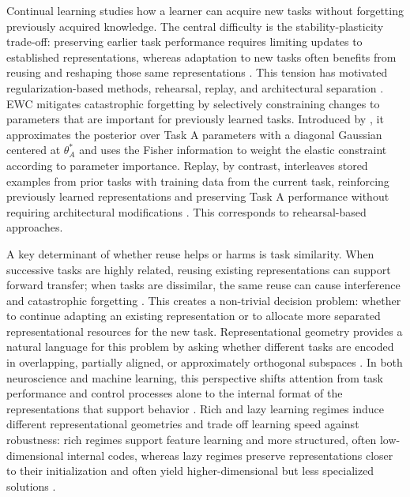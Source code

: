 \documentclass[letterpaper]{article}
\begin{document}
Continual learning studies how a learner can acquire new tasks without forgetting previously acquired knowledge. The central difficulty is the stability-plasticity trade-off: preserving earlier task performance requires limiting updates to established representations, whereas adaptation to new tasks often benefits from reusing and reshaping those same representations \cite{lee2021continual,holton2025humans}. This tension has motivated regularization-based methods, rehearsal, replay, and architectural separation \cite{wickramasinghe2023continual}. EWC mitigates catastrophic forgetting by selectively constraining changes to parameters that are important for previously learned tasks. Introduced by \cite{kirkpatrick2017overcoming}, it approximates the posterior over Task A parameters with a diagonal Gaussian centered at $\theta^{*}_{A}$ and uses the Fisher information to weight the elastic constraint according to parameter importance. Replay, by contrast, interleaves stored examples from prior tasks with training data from the current task, reinforcing previously learned representations and preserving Task A performance without requiring architectural modifications \cite{robins1995catastrophic,rolnick2019experience,van2020brain}. This corresponds to rehearsal-based approaches.

A key determinant of whether reuse helps or harms is task similarity. When successive tasks are highly related, reusing existing representations can support forward transfer; when tasks are dissimilar, the same reuse can cause interference and catastrophic forgetting \cite{lee2021continual,menghi2025impact,holton2025humans, wakhloo2026neural}. This creates a non-trivial decision problem: whether to continue adapting an existing representation or to allocate more separated representational resources for the new task. Representational geometry provides a natural language for this problem by asking whether different tasks are encoded in overlapping, partially aligned, or approximately orthogonal subspaces \cite{flesch2022representation}. In both neuroscience and machine learning, this perspective shifts attention from task performance and control processes alone to the internal format of the representations that support behavior \cite{flesch2022representation}. Rich and lazy learning regimes induce different representational geometries and trade off learning speed against robustness: rich regimes support feature learning and more structured, often low-dimensional internal codes, whereas lazy regimes preserve representations closer to their initialization and often yield higher-dimensional but less specialized solutions \cite{flesch2022representation, seguin2022network}. 
\end{document}
